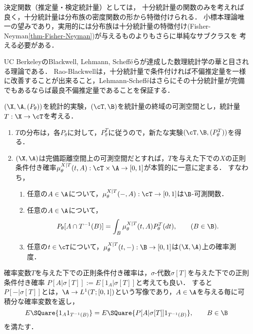 \documentclass[uplatex,dvipdfmx]{jsreport}
\begin{document}
\begin{tcolorbox}[colframe=ForestGreen, colback=ForestGreen!10!white,breakable,colbacktitle=ForestGreen!40!white,coltitle=black,fonttitle=\bfseries\sffamily,
title=]
    決定関数（推定量・検定統計量）としては，
    十分統計量の関数のみを考えれば良く，十分統計量は分布族の密度関数の形から特徴付けられる．
    小標本理論唯一の望みであり，実用的には分布族は十分統計量の特徴付け(Fisher-Neyman\ref{thm-Fisher-Neyman})が与えるものよりもさらに単純なサブクラスを
    考える必要がある．
\end{tcolorbox}

\begin{history}
    UC BerkeleyのBlackwell, Lehmann, Schefféらが達成した数理統計学の華と目される理論である．
    Rao-Blackwellは，十分統計量で条件付ければ不偏推定量を一様に改善することが出来ること，Lehmann-Schefféはさらにその十分統計量が完備でもあるならば最良不偏推定量であることを保証する．
\end{history}

\begin{problem}
    $(\X,\A,(P_\theta))$を統計的実験，$(\cT,\B)$を統計量の終域の可測空間とし，統計量$T:\X\to\cT$を考える．
    \begin{enumerate}
        \item $T$の分布は，各$P_\theta$に対して，$P^T_\theta$に従うので，新たな実験$(\cT,\B,(P^T_\theta))$を得る．
        \item $(\X,\A)$は完備距離空間上の可測空間だとすれば，$T$を与えた下での$X$の正則条件付き確率$\mu^{X|T}_\theta(t,A):\cT\times\A\to[0,1]$が本質的に一意に定まる．
        すなわち，
        \begin{enumerate}
            \item 任意の$A\in\A$について，$\mu^{X|T}_\theta(-,A):\cT\to[0,1]$は$\B$-可測関数．
            \item 任意の$A\in\A$について，
            \[P_\theta[A\cap T^{-1}(B)]=\int_B\mu_\theta^{X|T}(t,A)P_\theta^T(dt),\qquad(B\in\B).\]
            \item 任意の$t\in\cT$について，$\mu^{X|T}_\theta(t,-):\B\to[0,1]$は$(\X,\A)$上の確率測度．
        \end{enumerate}
    \end{enumerate}
\end{problem}
\begin{remarks}
    確率変数$T$を与えた下での正則条件付き確率は，$\sigma$-代数$\sigma[T]$を与えた下での正則条件付き確率
    $P[A|\sigma[T]]:=E[1_A|\sigma[T]]$と考えても良い．
    すると$P[-|\sigma[T]]$とは，$\A\to L^1(T;[0,1])$という写像であり，$A\in\A$を与える毎に可積分な確率変数を返し，
    \[E\SQuare{1_A1_{T^{-1}(B)}}=E\SQuare{P[A|\sigma[T]]1_{T^{-1}(B)}},\qquad B\in\B\]
    を満たす．
\end{remarks}
\end{document}

